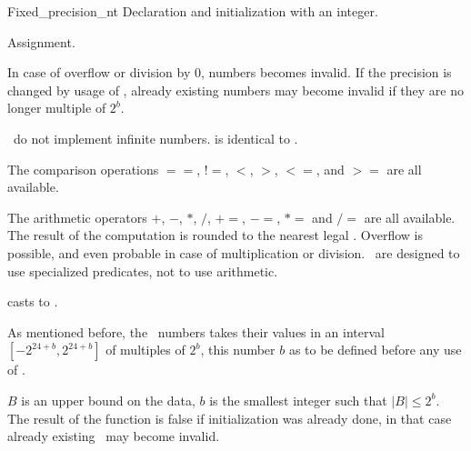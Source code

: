 \begin{ccClass}{Fixed_precision_nt}
            {Declaration and initialization with an integer.}

\ccOperations


        {Assignment. 
}

{In case of overflow or division by 0, numbers becomes invalid.
If the precision is changed by usage of 
, already existing numbers may become invalid
if they are no longer multiple of $2^b$.}

{ \ccClassName\ do not implement infinite numbers. 
   is identical to .}

The comparison operations $==$, $!=$, $<$, $>$, $<=$, and $>=$ are all
available.

The arithmetic operators $+$, $-$, $*$, $/$, $+=$, $-=$, $*=$ and $/=$
are all available. The result of the computation is rounded to the
nearest legal \ccClassName. Overflow is possible, and even probable in case
of multiplication or division. \ccClassName\ are designed to use
specialized predicates, not to use arithmetic.


         {casts to .}



As mentioned before, the \ccClassName\ numbers takes their values in an
interval $[-2^{24+b},2^{24+b}]$ of multiples of $2^b$,
this number $b$ as to be defined before any
 use of .


{$B$ is an upper bound on the data, $b$ is the smallest integer such that 
$|B|\leq 2^b$. The result of the function is false if initialization was
already done, in that case already existing \ccClassName\ may become invalid.}


\end{ccClass}
